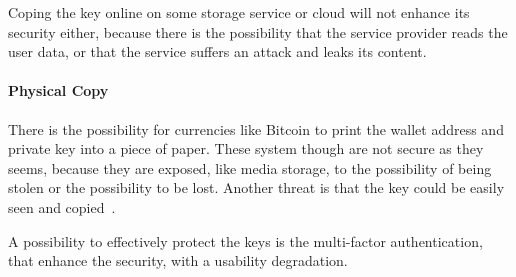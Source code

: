 Coping the key online on some storage service or cloud will not enhance its
security either, because there is the possibility that the service provider
reads the user data, or that the service suffers an attack and leaks its
content.

\paragraph{Physical Copy} There is the possibility for currencies like Bitcoin
to print the wallet address and private key into a piece of paper. These system
though are not secure as they seems, because they are exposed, like media
storage, to the possibility of being stolen or the possibility to be lost.
Another threat is that the key could be easily seen and
copied~\cite{eskandari15}.


A possibility to effectively protect the keys is the multi-factor
authentication, that enhance the security, with a usability degradation.
